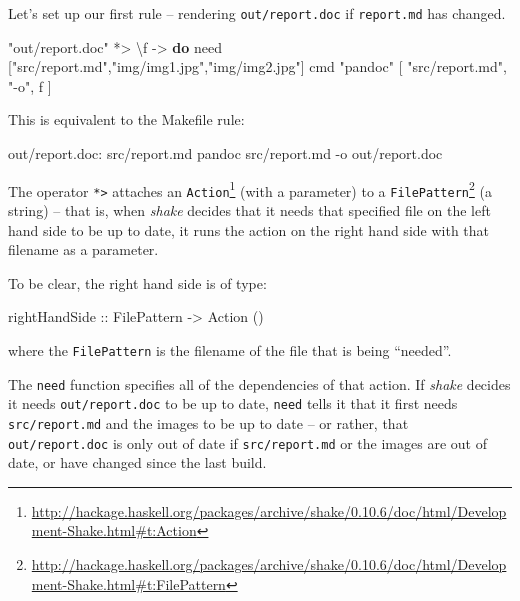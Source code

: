 \documentclass[]{article}
\newenvironment{Shaded}{}{}
\newcommand{\DataTypeTok}[1]{\textcolor[rgb]{0.56,0.13,0.00}{#1}}
\newcommand{\DecValTok}[1]{\textcolor[rgb]{0.25,0.63,0.44}{#1}}
\newcommand{\KeywordTok}[1]{\textcolor[rgb]{0.00,0.44,0.13}{\textbf{#1}}}
\newcommand{\NormalTok}[1]{#1}
\newcommand{\OperatorTok}[1]{\textcolor[rgb]{0.40,0.40,0.40}{#1}}
\newcommand{\OtherTok}[1]{\textcolor[rgb]{0.00,0.44,0.13}{#1}}
\newcommand{\StringTok}[1]{\textcolor[rgb]{0.25,0.44,0.63}{#1}}
\renewcommand{\href}[2]{#2\footnote{\url{#1}}}
\begin{document}
Let's set up our first rule -- rendering \texttt{out/report.doc} if
\texttt{report.md} has changed.

\begin{Shaded}
\begin{Highlighting}[]
\StringTok{"out/report.doc"} \OperatorTok{*\textgreater{}}\NormalTok{ \textbackslash{}f }\OtherTok{{-}\textgreater{}} \KeywordTok{do}
\NormalTok{    need [}\StringTok{"src/report.md"}\NormalTok{,}\StringTok{"img/img1.jpg"}\NormalTok{,}\StringTok{"img/img2.jpg"}\NormalTok{]}
\NormalTok{    cmd }\StringTok{"pandoc"}\NormalTok{ [ }\StringTok{"src/report.md"}\NormalTok{, }\StringTok{"{-}o"}\NormalTok{, f ]}
\end{Highlighting}
\end{Shaded}

This is equivalent to the Makefile rule:

\begin{Shaded}
\begin{Highlighting}[]
\DecValTok{out/report.doc:}\DataTypeTok{ src/report.md}
\NormalTok{	pandoc src/report.md {-}o out/report.doc}
\end{Highlighting}
\end{Shaded}

The operator \texttt{*\textgreater{}} attaches an
\href{http://hackage.haskell.org/packages/archive/shake/0.10.6/doc/html/Development-Shake.html\#t:Action}{\texttt{Action}}
(with a parameter) to a
\href{http://hackage.haskell.org/packages/archive/shake/0.10.6/doc/html/Development-Shake.html\#t:FilePattern}{\texttt{FilePattern}}
(a string) -- that is, when \emph{shake} decides that it needs that specified
file on the left hand side to be up to date, it runs the action on the right
hand side with that filename as a parameter.

To be clear, the right hand side is of type:

\begin{Shaded}
\begin{Highlighting}[]
\OtherTok{rightHandSide ::} \DataTypeTok{FilePattern} \OtherTok{{-}\textgreater{}} \DataTypeTok{Action}\NormalTok{ ()}
\end{Highlighting}
\end{Shaded}

where the \texttt{FilePattern} is the filename of the file that is being
``needed''.

The \texttt{need} function specifies all of the dependencies of that action. If
\emph{shake} decides it needs \texttt{out/report.doc} to be up to date,
\texttt{need} tells it that it first needs \texttt{src/report.md} and the images
to be up to date -- or rather, that \texttt{out/report.doc} is only out of date
if \texttt{src/report.md} or the images are out of date, or have changed since
the last build.
\end{document}
